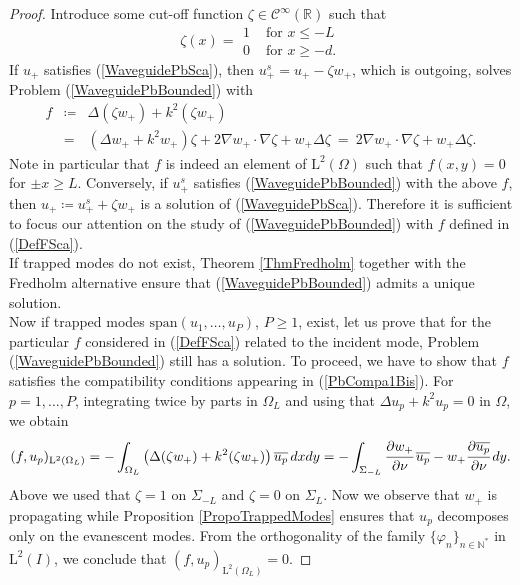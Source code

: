 \documentclass[11pt,a4paper]{report}
\newcommand{\dsp}{\displaystyle}
\newcommand{\Om}{\Omega}
\newcommand{\mrm}[1]{\mathrm{#1}}
\newcommand{\N}{\mathbb{N}}
\newcommand{\R}{\mathbb{R}}
\newcommand{\mL}{\mrm{L}}
\begin{document}
\begin{proof}
Introduce some cut-off function $\zeta\in\mathscr{C}^{\infty}(\R)$ such that  
\[
\zeta(x)=\begin{array}{|ll}
1 & \mbox{ for }x\le-L\\[2pt]
0 & \mbox{ for }x\ge-d.
\end{array}
\] 
If $u_+$ satisfies (\ref{WaveguidePbSca}), then $u^s_+=u_+-\zeta w_+$, which is outgoing, solves Problem (\ref{WaveguidePbBounded}) with 
\begin{equation}\label{DefFSca}
\begin{array}{rcl}
f&\coloneqq&\Delta(\zeta w_+)+k^2(\zeta w_+)\\[3pt]
&=&(\Delta w_++k^2 w_+)\zeta+2\nabla w_+\cdot \nabla\zeta+w_+\Delta\zeta \ = \ 2\nabla w_+\cdot \nabla\zeta+w_+\Delta\zeta.
\end{array}
\end{equation}
Note in particular that $f$ is indeed an element of $\mL^2(\Om)$ such that $f(x,y)=0$ for $\pm x\ge L$. Conversely, if $u^s_+$ satisfies (\ref{WaveguidePbBounded}) with the above $f$, then $u_+\coloneqq u^s_++\zeta w_+$ is a solution of (\ref{WaveguidePbSca}). Therefore it is sufficient to focus our attention on the study of (\ref{WaveguidePbBounded}) with $f$ defined in (\ref{DefFSca}).\\ 
\newline
If trapped modes do not exist, Theorem \ref{ThmFredholm} together with the Fredholm alternative ensure that (\ref{WaveguidePbBounded}) admits a unique solution.\\
Now if trapped modes $\mrm{span}(u_1,\dots,u_P)$, $P\ge1$, exist, let us prove that for the particular $f$ considered in (\ref{DefFSca}) related to the incident mode, Problem (\ref{WaveguidePbBounded}) still has a solution. To proceed, we have to show that $f$ satisfies the compatibility conditions appearing in (\ref{PbCompa1Bis}). For $p=1,\dots,P$, integrating twice by parts in $\Om_L$ and using that $\Delta u_p+k^2 u_p=0$ in $\Om$, we obtain
\[
(f,u_p)_{\mL^2(\Om_L)} =\dsp -\int_{\Om_L}\left(\Delta(\zeta w_+)+k^2(\zeta w_+)\right)\overline{u_p}\,dxdy =-\int_{\Sigma_{-L}}\cfrac{\partial w_+}{\partial \nu}\,\overline{u_p}-w_+\cfrac{\partial \overline{u_p}}{\partial \nu}\,dy.
\]
Above we used that $\zeta =1$ on $\Sigma_{-L}$ and $\zeta =0$ on $\Sigma_{L}$. Now we observe that $w_+$ is propagating while Proposition \ref{PropoTrappedModes} ensures that $u_p$ decomposes only on the evanescent modes. From the orthogonality of the family $\{\varphi_n\}_{n\in\N^\ast}$ in $\mL^2(I)$, we conclude that $(f,u_p)_{\mL^2(\Om_L)} =0$.
\end{proof}
\end{document}
